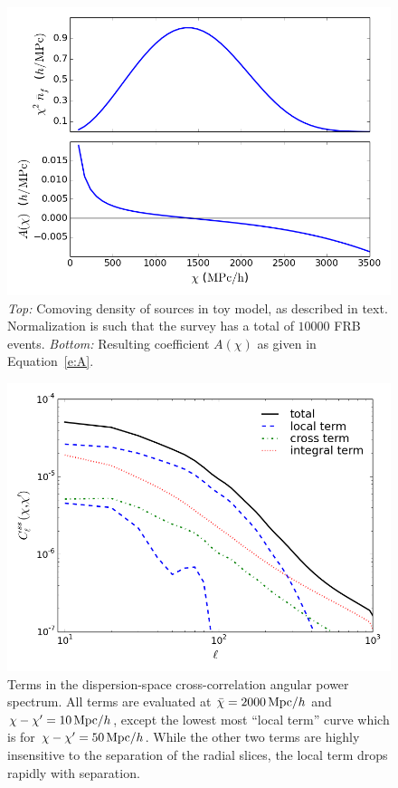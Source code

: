 \documentclass[twocolumn,prl,floatfix]{revtex4-1}
\begin{document}
\begin{figure}
    \includegraphics[scale=0.42]{figures/n_f}
    \caption{
        \label{f:n_f}
        \emph{Top:} Comoving density of sources in toy model, as described in
        text. Normalization is
        such that the survey has a total of $10000$ FRB events.
        \emph{Bottom:} Resulting coefficient $A(\chi)$ as given in
        Equation~\ref{e:A}.
    }
\end{figure}

\begin{figure}
    \includegraphics[scale=0.42]{figures/terms}
    \caption{
        \label{f:terms}
        Terms in the dispersion-space cross-correlation angular power spectrum.
        All terms are evaluated at $\bar\chi=2000\,{\rm Mpc}/h$ and 
        $\chi - \chi' = 10\,{\rm Mpc}/h$, except the lowest most 
        ``local term'' curve which is for $\chi - \chi'=50\,{\rm Mpc}/h$. 
        While
        the other two terms are highly insensitive to the separation of
        the radial slices, the local term drops rapidly with separation.
    }
\end{figure}
\end{document}
